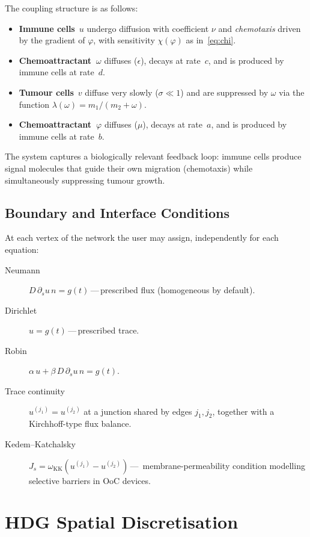 \documentclass[11pt,a4paper]{article}
\begin{document}
\noindent
The coupling structure is as follows:
\begin{itemize}
  \item \textbf{Immune cells}~$u$ undergo diffusion with coefficient
        $\nu$ and \emph{chemotaxis} driven by the gradient of
        $\varphi$, with sensitivity $\chi(\varphi)$ as
        in~\eqref{eq:chi}.
  \item \textbf{Chemoattractant~$\omega$} diffuses ($\epsilon$),
        decays at rate~$c$, and is produced by immune cells at
        rate~$d$.
  \item \textbf{Tumour cells}~$v$ diffuse very slowly ($\sigma\ll 1$)
        and are suppressed by $\omega$ via the
        function $\lambda(\omega)=m_1/(m_2+\omega)$.
  \item \textbf{Chemoattractant~$\varphi$} diffuses ($\mu$),
        decays at rate~$a$, and is produced by immune cells at
        rate~$b$.
\end{itemize}
The system captures a biologically relevant feedback loop:
immune cells produce signal molecules that guide their own
migration (chemotaxis) while simultaneously suppressing tumour
growth.


\subsection{Boundary and Interface Conditions}\label{sec:bc}

At each vertex of the network the user may assign, independently
for each equation:
\begin{description}
  \item[Neumann] $D\,\partial_s u\,n = g(t)$\,---\,prescribed
        flux (homogeneous by default).
  \item[Dirichlet] $u = g(t)$\,---\,prescribed trace.
  \item[Robin] $\alpha\,u + \beta\,D\,\partial_s u\,n = g(t)$.
  \item[Trace continuity] $u^{(j_1)}=u^{(j_2)}$ at a junction
        shared by edges $j_1,j_2$, together with a Kirchhoff-type
        flux balance.
  \item[Kedem--Katchalsky]
        $J_s=\omega_{\mathrm{KK}}(u^{(j_1)}-u^{(j_2)})$\,---\,%
        membrane-permeability condition modelling selective barriers
        in OoC devices.
\end{description}


\section{HDG Spatial Discretisation}\label{sec:hdg}
\end{document}
